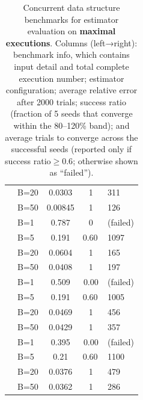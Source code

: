 \documentclass[acmsmall]{acmart}
\begin{document}
\begin{table}[t]
\begin{tabular}{@{} l l S[scientific-notation=true] S[table-format=1.2] l @{}}
    &  B=20           & \num{0.0303} & {1} & \num{311} \\
    &  B=50           & \num{0.00845} & {1} & \num{126} \\ 
    \midrule
         &  B=1              & \num{0.787} & \num{0} & (failed) \\
    &  B=5             & \num{0.191} & {\num{0.60}\,}  & \num{1097} \\
    &  B=20            & \num{0.0604} & {1} & \num{165} \\
    &  B=50            & \num{0.0408} & {1} & \num{197}  \\ 
    \midrule
{} & B=1 & \num{0.509} & \num{0.00} & (failed) \\
    &B=5      & \num{0.191} & {\num{0.60}\,}  & \num{1005} \\
    &  B=20     & \num{0.0469} & {1} & \num{456} \\
    & B=50     & \num{0.0429} & {1} & \num{357} \\
    \midrule
    
 &   B=1 & \num{0.395} & \num{0.00} & (failed) \\
    &  B=5      & \num{0.21} & {\num{0.60}\,} & \num{1100} \\
    &  B=20     & \num{0.0376} & {1} & \num{479} \\
    &  B=50     & \num{0.0362} & {1} & \num{286} \\
    \bottomrule



  \end{tabular}

  \vspace{0.1in}
  \caption{Concurrent data structure benchmarks for estimator evaluation on  \textbf{maximal executions}. Columns (left→right): benchmark info, which contains input detail and total complete execution number; estimator configuration; average relative error after 2000 trials; success ratio (fraction of 5 seeds that converge within the 80–120\% band); and average trials to converge across the successful seeds (reported only if success ratio$\geq 0.6$; otherwise shown as “failed”). }
    \label{tab:convergence}

\end{table}
\end{document}
